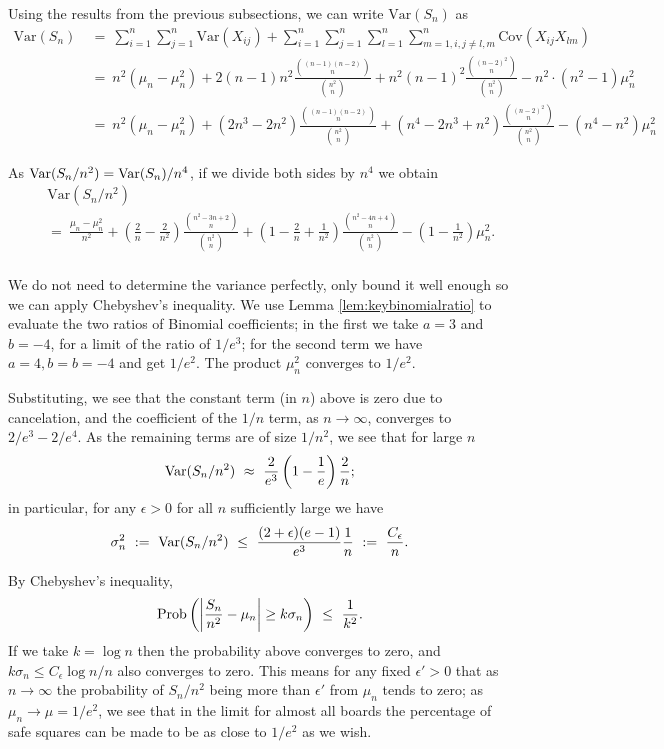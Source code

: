 \documentclass[12pt,reqno]{amsart}
\numberwithin{equation}{section}
\theoremstyle{plain}
\newcommand\be{\begin{equation}}
\newcommand\ee{\end{equation}}
\newcommand{\ncr}[2]{{#1 \choose #2}}
\begin{document}
Using the results from the previous subsections, we can write $\text{Var}(S_n)$ as
\begin{align}
    \text{Var}(S_n) &\ = \  \sum_{i = 1}^n\sum_{j=1}^n\text{Var}(X_{ij}) + \sum_{i=1}^n\sum_{j=1}^n \sum_{l=1}^n\sum_{m=1, i,j \neq l,m}^n\text{Cov}(X_{ij}X_{lm}) \nonumber\\
    &\ = \  n^2(\mu_n - \mu_n^2) + 2(n-1)n^2 \frac{\ncr{(n-1)(n-2)}{n}}{\ncr{n^2}{n}} + n^2(n-1)^2\frac{\ncr{(n-2)^2}{n}}{\ncr{n^2}{n}} - n^2  \cdot  (n^2 - 1)\mu_n^2  \nonumber\\
    &\ = \  n^2(\mu_n - \mu_n^2) + (2n^3 - 2n^2) \frac{\ncr{(n-1)(n-2)}{n}}{\ncr{n^2}{n}} + (n^4-2n^3 + n^2)\frac{\ncr{(n-2)^2}{n}}{\ncr{n^2}{n}} - (n^4 - n^2)\mu_n^2
\end{align}

As ${\rm Var}(S_n/n^2) = {\rm Var}(S_n)/n^4$, if we divide both sides by $n^4$ we obtain
\begin{eqnarray}
 & & \text{Var}(S_n/n^2)\nonumber\\
&    & = \  \frac{\mu_n - \mu_n^2}{n^2} + \left(\frac{2}{n} - \frac{2}{n^2}\right) \frac{\ncr{n^2 - 3n + 2}{n}}{\ncr{n^2}{n}} + \left(1-\frac{2}{n} + \frac{1}{n^2}\right)\frac{\ncr{n^2-4n+4}{n}}{\ncr{n^2}{n}} - \left(1 - \frac{1}{n^2}\right)\mu_n^2. \nonumber\\
\end{eqnarray}

We do not need to determine the variance perfectly, only bound it well enough so we can apply Chebyshev's inequality. We use Lemma \ref{lem:keybinomialratio} to evaluate the two ratios of Binomial coefficients; in the first we take $a=3$ and $b=-4$, for a limit of the ratio of $1/e^3$; for the second term we have $a=4, b=b=-4$ and get $1/e^2$. The product $\mu_n^2$ converges to $1/e^2$.

Substituting, we see that the constant term (in $n$) above is zero due to cancelation, and the coefficient of the $1/n$ term, as $n\to\infty$, converges to $2/e^3 - 2/e^4$. As the remaining terms are of size $1/n^2$, we see that for large $n$ \be {\rm Var}(S_n/n^2) \ \approx \ \frac{2}{e^3} \left(1 - \frac1{e}\right) \frac{2}{n}; \ee in particular, for any $\epsilon > 0$ for all $n$ sufficiently large we have \be \sigma_n^2 \ := \ {\rm Var}(S_n/n^2) \ \le \ \frac{(2+\epsilon)(e-1)}{e^3} \frac1{n} \ := \ \frac{C_\epsilon}{n}. \ee

By Chebyshev's inequality, \be {\rm Prob}\left(\left|\frac{S_n}{n^2} - \mu_n\right| \ge k \sigma_n\right) \ \le \ \frac1{k^2}. \ee If we take $k = \log n$ then the probability above converges to zero, and $k \sigma_n \le C_\epsilon \log n / n$ also converges to zero. This means for any fixed $\epsilon' > 0$ that as $n\to\infty$ the probability of $S_n/n^2$ being more than $\epsilon'$ from $\mu_n$ tends to zero; as $\mu_n \to \mu = 1/e^2$, we see that in the limit for almost all boards the percentage of safe squares can be made to be as close to $1/e^2$ as we wish.
\end{document}
